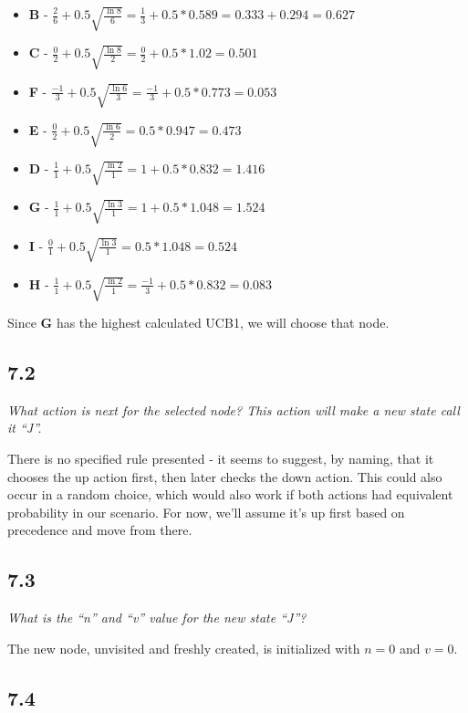 \documentclass{article}
\begin{document}
\begin{itemize}
    \item \textbf{B} - $\frac{2}{6}+ 0.5 \sqrt{\frac{\ln{8}}{6}} = \frac{1}{3} + 0.5 * 0.589 = 0.333 + 0.294 = 0.627$
    \item \textbf{C} - $\frac{0}{2}+ 0.5 \sqrt{\frac{\ln{8}}{2}} = \frac{0}{2} + 0.5 * 1.02 = 0.501$
    \item \textbf{F} - $\frac{-1}{3}+ 0.5 \sqrt{\frac{\ln{6}}{3}} = \frac{-1}{3} + 0.5 * 0.773 = 0.053$
    \item \textbf{E} - $\frac{0}{2}+ 0.5 \sqrt{\frac{\ln{6}}{2}} = 0.5 * 0.947 = 0.473$
    \item \textbf{D} - $\frac{1}{1}+ 0.5 \sqrt{\frac{\ln{2}}{1}} = 1 + 0.5 * 0.832 = 1.416$
    \item \textbf{G} - $\frac{1}{1}+ 0.5 \sqrt{\frac{\ln{3}}{1}} = 1 + 0.5 * 1.048 = 1.524$
    \item \textbf{I} - $\frac{0}{1}+ 0.5 \sqrt{\frac{\ln{3}}{1}} = 0.5 * 1.048 = 0.524$
    \item \textbf{H} - $\frac{1}{1}+ 0.5 \sqrt{\frac{\ln{2}}{1}} = \frac{-1}{3} + 0.5 * 0.832 = 0.083$
\end{itemize}

Since \textbf{G} has the highest calculated UCB1, we will choose that node.

\subsection*{7.2}

\textit{What action is next for the selected node? This action will make a new state call it “J”.}

There is no specified rule presented - it seems to suggest, by naming, that it chooses the up action first, then later checks the down action. This could also occur in a random choice, which would also work if both actions had equivalent probability in our scenario. For now, we'll assume it's up first based on precedence and move from there.

\subsection*{7.3}

\textit{What is the “n” and “v” value for the new state “J”?}

The new node, unvisited and freshly created, is initialized with $n=0$ and $v=0$.

\subsection*{7.4}
\end{document}
